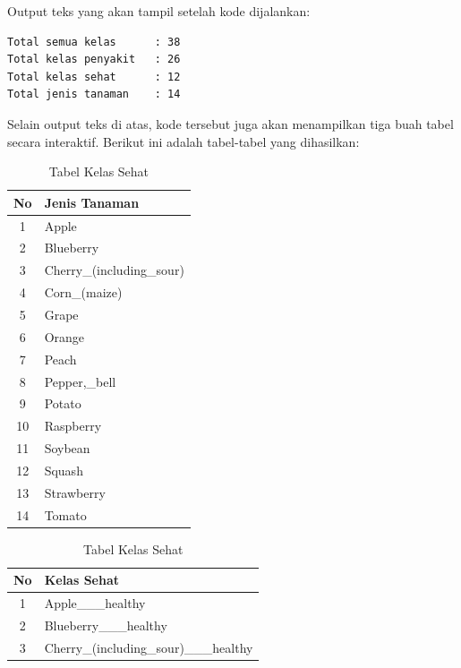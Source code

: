 Output teks yang akan tampil setelah kode dijalankan:

\begin{outputcode}[H]
\begin{lstlisting}[language={}]
Total semua kelas      : 38
Total kelas penyakit   : 26
Total kelas sehat      : 12
Total jenis tanaman    : 14
\end{lstlisting}
\caption{Output ringkasan jumlah kelas}
\end{outputcode}

Selain output teks di atas, kode tersebut juga akan menampilkan tiga buah tabel secara interaktif. Berikut ini adalah tabel-tabel yang dihasilkan:

\begin{table}[H]
\centering
\small
\begin{minipage}[t]{0.45\textwidth}
\centering
\caption{Tabel Daftar Tanaman}
\begin{tabular}{|c|p{4cm}|}
\hline
\textbf{No} & \textbf{Jenis Tanaman} \\ \hline
1 & Apple \\ \hline
2 & Blueberry \\ \hline
3 & Cherry\_(including\_sour) \\ \hline
4 & Corn\_(maize) \\ \hline
5 & Grape \\ \hline
6 & Orange \\ \hline
7 & Peach \\ \hline
8 & Pepper,\_bell \\ \hline
9 & Potato \\ \hline
10 & Raspberry \\ \hline
11 & Soybean \\ \hline
12 & Squash \\ \hline
13 & Strawberry \\ \hline
14 & Tomato \\ \hline
\end{tabular}
\end{minipage}\hfill
\begin{minipage}[t]{0.53\textwidth}
\centering
\caption{Tabel Kelas Sehat}
\begin{tabular}{|c|p{4.5cm}|}
\hline
\textbf{No} & \textbf{Kelas Sehat} \\ \hline
1 & Apple\_\_\_\allowbreak healthy \\ \hline
2 & Blueberry\_\_\_\allowbreak healthy \\ \hline
3 & Cherry\_(including\_sour)\_\_\_\allowbreak healthy \\ \hline

\end{tabular}
\end{minipage}
\end{table}
